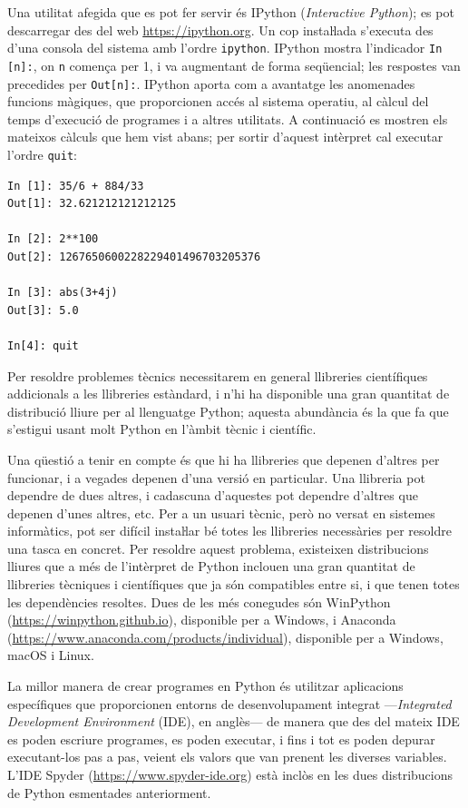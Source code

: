 Una utilitat afegida que es pot fer servir és IPython (\textit{Interactive Python}); es pot descarregar des del web \href{https://ipython.org/}{https:/\!\!/ipython.org}. Un cop instaŀlada s'executa des d'una consola del sistema amb l'ordre \texttt{ipython}. IPython mostra l'indicador \texttt{In [n]:}, on \texttt{n} comença per 1, i va augmentant de forma seqüencial; les respostes van precedides per \texttt{Out[n]:}. IPython aporta com a avantatge les anomenades funcions màgiques, que proporcionen accés al sistema operatiu, al càlcul del temps d'execució de programes i a altres utilitats. A continuació es mostren els mateixos càlculs que hem vist abans; per sortir d'aquest intèrpret cal executar l'ordre \texttt{quit}:
\begin{lstlisting}
In [1]: 35/6 + 884/33
Out[1]: 32.621212121212125

In [2]: 2**100
Out[2]: 1267650600228229401496703205376

In [3]: abs(3+4j)
Out[3]: 5.0

In[4]: quit
\end{lstlisting}

Per resoldre problemes tècnics necessitarem en general llibreries científiques addicionals a les llibreries  estàndard,  i n'hi ha disponible una gran quantitat de distribució lliure  per al llenguatge Python; aquesta abundància és la que fa que s'estigui usant molt Python en l'àmbit tècnic i científic.

Una qüestió a tenir en compte és que hi ha llibreries que depenen d'altres per funcionar, i a vegades  depenen d'una versió en particular. Una llibreria pot dependre de dues altres, i cadascuna d'aquestes pot dependre d'altres que depenen d'unes altres, etc. Per a un usuari tècnic, però no versat en sistemes informàtics, pot ser difícil instaŀlar bé totes les llibreries necessàries per resoldre una tasca en concret. Per resoldre aquest problema, existeixen distribucions lliures que a més de l'intèrpret de Python inclouen una gran quantitat de llibreries tècniques i científiques que ja són compatibles entre si, i que tenen totes les dependències resoltes. Dues de les més conegudes són WinPython (\href{https://winpython.github.io/}{https:/\!\!/winpython.github.io}), disponible  per a Windows, i
Anaconda (\href{https://www.anaconda.com/products/individual}{https:/\!\!/www.anaconda.com/products/individual}), disponible per a Windows, macOS i Linux.



La millor manera de crear programes en Python és utilitzar aplicacions específiques que proporcionen entorns  de desenvolupament integrat ---\textit{Integrated Development Environment} (IDE), en anglès--- de manera que des del mateix IDE es poden escriure programes, es poden executar, i fins i tot es poden depurar executant-los pas a pas, veient els valors que van prenent les diverses variables. L'IDE Spyder (\href{https://www.spyder-ide.org/}{https:/\!\!/www.spyder-ide.org}) està inclòs en les dues distribucions de Python esmentades anteriorment. 

